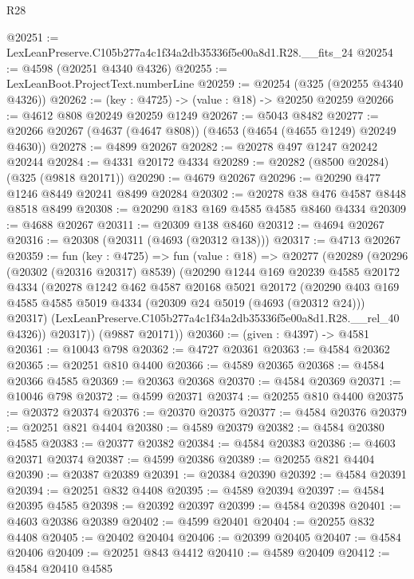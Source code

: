 \begin{lexlean}{R28}
\begin{coremodule}
@20251 := LexLeanPreserve.C105b277a4c1f34a2db35336f5e00a8d1.R28.__fits_24
@20254 := @4598 (@20251 @4340 @4326)
@20255 := LexLeanBoot.ProjectText.numberLine
@20259 := @20254 (@325 (@20255 @4340 @4326))
@20262 := (key : @4725) -> (value : @18) -> @20250 @20259
@20266 := @4612 @808 @20249 @20259 @1249
@20267 := @5043 @8482
@20277 := @20266 @20267 (@4637 (@4647 @808)) (@4653 (@4654 (@4655 @1249) @20249 @4630))
@20278 := @4899 @20267
@20282 := @20278 @497 @1247 @20242 @20244
@20284 := @4331 @20172 @4334
@20289 := @20282 (@8500 @20284) (@325 (@9818 @20171))
@20290 := @4679 @20267
@20296 := @20290 @477 @1246 @8449 @20241 @8499 @20284
@20302 := @20278 @38 @476 @4587 @8448 @8518 @8499
@20308 := @20290 @183 @169 @4585 @4585 @8460 @4334
@20309 := @4688 @20267
@20311 := @20309 @138 @8460
@20312 := @4694 @20267
@20316 := @20308 (@20311 (@4693 (@20312 @138)))
@20317 := @4713 @20267
@20359 := fun (key : @4725) =>
  fun (value : @18) =>
  @20277
    (@20289
      (@20296
        (@20302 (@20316 @20317) @8539)
        (@20290
          @1244
          @169
          @20239
          @4585
          @20172
          @4334
          (@20278
            @1242
            @462
            @4587
            @20168
            @5021
            @20172
            (@20290
              @403
              @169
              @4585
              @4585
              @5019
              @4334
              (@20309 @24 @5019 (@4693 (@20312 @24)))
              @20317)
            (LexLeanPreserve.C105b277a4c1f34a2db35336f5e00a8d1.R28.__rel_40 @4326))
          @20317))
      (@9887 @20171))
@20360 := (given : @4397) -> @4581
@20361 := @10043 @798
@20362 := @4727 @20361
@20363 := @4584 @20362
@20365 := @20251 @810 @4400
@20366 := @4589 @20365
@20368 := @4584 @20366 @4585
@20369 := @20363 @20368
@20370 := @4584 @20369
@20371 := @10046 @798
@20372 := @4599 @20371
@20374 := @20255 @810 @4400
@20375 := @20372 @20374
@20376 := @20370 @20375
@20377 := @4584 @20376
@20379 := @20251 @821 @4404
@20380 := @4589 @20379
@20382 := @4584 @20380 @4585
@20383 := @20377 @20382
@20384 := @4584 @20383
@20386 := @4603 @20371 @20374
@20387 := @4599 @20386
@20389 := @20255 @821 @4404
@20390 := @20387 @20389
@20391 := @20384 @20390
@20392 := @4584 @20391
@20394 := @20251 @832 @4408
@20395 := @4589 @20394
@20397 := @4584 @20395 @4585
@20398 := @20392 @20397
@20399 := @4584 @20398
@20401 := @4603 @20386 @20389
@20402 := @4599 @20401
@20404 := @20255 @832 @4408
@20405 := @20402 @20404
@20406 := @20399 @20405
@20407 := @4584 @20406
@20409 := @20251 @843 @4412
@20410 := @4589 @20409
@20412 := @4584 @20410 @4585

\end{coremodule}
\end{lexlean}
